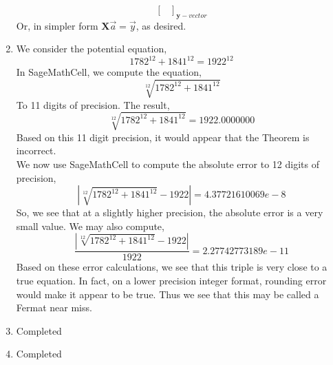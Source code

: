 \documentclass[letterpaper,10pt]{article}
\begin{document}
\begin{enumerate}
\[{\begin{bmatrix}
\end{bmatrix}}_{\textbf{y}-vector} \]
Or, in simpler form $\textbf{X}\vec{a}=\vec{y}$, as desired.
\item We consider the potential equation,
\[1782^{12}+1841^{12}=1922^{12}\]
In SageMathCell, we compute the equation,
\[\sqrt[12]{1782^{12}+1841^{12}}\]
To 11 digits of precision. The result,
\[\sqrt[12]{1782^{12}+1841^{12}}=1922.0000000\]
Based on this 11 digit precision, it would appear that the Theorem is incorrect.\\
We now use SageMathCell to compute the absolute error to 12 digits of precision,
\[|\sqrt[12]{1782^{12}+1841^{12}}-1922|=4.37721610069e-8\]
So, we see that at a slightly higher precision, the absolute error is a very small value. We may also compute,
\[\frac{|\sqrt[12]{1782^{12}+1841^{12}}-1922|}{1922}=2.27742773189e-11\]
Based on these error calculations, we see that this triple is very close to a true equation. In fact, on a lower precision integer format, rounding error would make it appear to be true. Thus we see that this may be called a Fermat near miss.
\item Completed
\item Completed
\end{enumerate}
\end{document}
